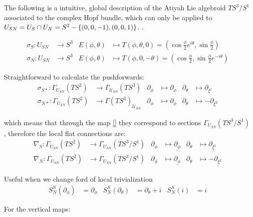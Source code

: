 \linea

The following is a intuitive, global description of the Atiyah Lie algebroid $TS^3/S^1$ associated to the complex Hopf bundle, which can only be applied to $U_{SN} = U_S \cap U_N = S^2 - \left\{ (0, 0, -1), (0, 0, 1) \right\}$. .

\begin{align*}
    \sigma_S : U_{SN} &\to S^3 &       E(\phi, \theta) &\mapsto T(\phi, \theta, 0) = (\cos \frac{\phi}{2} e^{i \theta}, \sin \frac{\phi}{2} )\\
    \sigma_N : U_{SN} &\to S^3 &       E(\phi, \theta) &\mapsto T(\phi, 0, -\theta) = (\cos \frac{\phi}{2} , \sin \frac{\phi}{2} e^{-i \theta})
\end{align*}

Straightforward to calculate the pushforwards:
\begin{align*}
    \sigma_{S*} : \Gamma_{U_{SN}}(TS^2) &\to \Gamma_{\mathcal U_{SN}}(TS^3) & \partial_\phi &\mapsto \partial_\phi & \partial_\theta &\mapsto \partial_{\xi^1}   \\
    \sigma_{N*} : \Gamma_{U_{SN}}(TS^2) &\to \Gamma(TS^3)_{\mathcal U_{SN}} & \partial_\phi &\mapsto \partial_\phi & \partial_\theta &\mapsto -\partial_{\xi^2}      
\end{align*}

which means that through the map \ref{} they correspond to sections $\Gamma_{U_{SN}}(TS^3/S^1)$, therefore the local flat connections are:
\begin{align}
    \nabla_{S} : \Gamma_{U_{SN}}(TS^2) &\to \Gamma_{U_{SN}}(TS^3/S^1) & \partial_\phi &\mapsto \underline{\partial_\phi} & \partial_\theta &\mapsto \underline{\partial_{\xi^1}}   \\
    \nabla_{N} : \Gamma_{U_{SN}}(TS^2) &\to \Gamma_{U_{SN}}(TS^3/S^1) & \partial_\phi &\mapsto \underline{\partial_\phi} & \partial_\theta &\mapsto -\underline{\partial_{\xi^2}}
\end{align}

Useful when we change ford of local trivialization
\begin{align*}
    S^S_N(\partial_\phi) &= \partial_\phi &  S^S_N(\partial_\theta) &= \partial_\theta + i & S^S_N(i) &= i
\end{align*}

\lin 

For the vertical maps:

